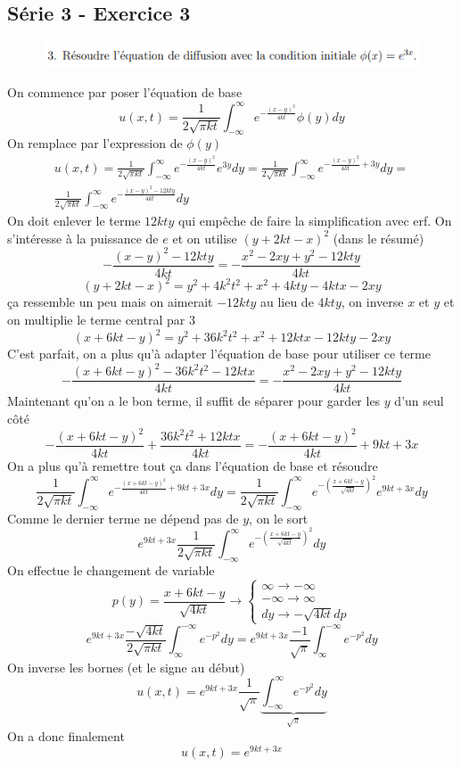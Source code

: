 \documentclass[resume]{subfiles}
\begin{document}
\begin{multicols}{2}
\subsection{Série 3 - Exercice 3}
\label{S3E3}
\begin{figure}[H]
\centering
\includegraphics[scale=0.5]{img_10.png}
\end{figure}
On commence par poser l'équation de base
$$u(x,t)=\frac{1}{2\sqrt{\pi kt}}\int_{-\infty}^{\infty}e^{-\frac{(x-y)^2}{4kt}}\phi(y)dy$$
On remplace par l'expression de $\phi(y)$
\begin{multline*}
u(x,t)=\frac{1}{2\sqrt{\pi kt}}\int_{-\infty}^{\infty}e^{-\frac{(x-y)^2}{4kt}}e^{3y}dy=\frac{1}{2\sqrt{\pi kt}}\int_{-\infty}^{\infty}e^{-\frac{(x-y)^2}{4kt}+3y}dy=\\\frac{1}{2\sqrt{\pi kt}}\int_{-\infty}^{\infty}e^{-\frac{(x-y)^2-12kty}{4kt}}dy
\end{multline*}
On doit enlever le terme $12kty$ qui empêche de faire la simplification avec erf. On s'intéresse à la puissance de $e$ et on utilise $(y+2kt-x)^2$ (dans le résumé)
$$-\frac{(x-y)^2-12kty}{4kt}=-\frac{x^2-2xy+y^2-12kty}{4kt}$$
$$(y+2kt-x)^2=y^2+4k^2t^2+x^2+4kty-4ktx-2xy$$
ça ressemble un peu mais on aimerait $-12kty$ au lieu de $4kty$, on inverse $x$ et $y$ et on multiplie le terme central par $3$
$$(x+6kt-y)^2=y^2+36k^2t^2+x^2+12ktx-12kty-2xy$$
C'est parfait, on a plus qu'à adapter l'équation de base pour utiliser ce terme
$$-\frac{(x+6kt-y)^2 - 36k^2t^2-12ktx}{4kt}=-\frac{x^2-2xy+y^2-12kty}{4kt}$$
Maintenant qu'on a le bon terme, il suffit de séparer pour garder les $y$ d'un seul côté
$$-\frac{(x+6kt-y)^2}{4kt} + \frac{36k^2t^2+12ktx}{4kt}=-\frac{(x+6kt-y)^2}{4kt} + 9kt+3x$$
On a plus qu'à remettre tout ça dans l'équation de base et résoudre
$$\frac{1}{2\sqrt{\pi kt}}\int_{-\infty}^{\infty}e^{-\frac{(x+6kt-y)^2}{4kt} + 9kt+3x}dy=\frac{1}{2\sqrt{\pi kt}}\int_{-\infty}^{\infty}e^{-\left(\frac{x+6kt-y}{\sqrt{4kt}}\right)^2}e^{9kt+3x}dy$$
Comme le dernier terme ne dépend pas de $y$, on le sort
$$e^{9kt+3x}\frac{1}{2\sqrt{\pi kt}}\int_{-\infty}^{\infty}e^{-\left(\frac{x+6kt-y}{\sqrt{4kt}}\right)^2}dy$$
On effectue le changement de variable
$$p(y)=\frac{x+6kt-y}{\sqrt{4kt}}\longrightarrow \begin{cases}\infty\to-\infty\\-\infty\to\infty\\dy\to -\sqrt{4kt}dp\end{cases}$$
$$e^{9kt+3x}\frac{-\sqrt{4kt}}{2\sqrt{\pi kt}}\int_{\infty}^{-\infty}e^{-p^2}dy=e^{9kt+3x}\frac{-1}{\sqrt{\pi}}\int_{\infty}^{-\infty}e^{-p^2}dy$$
On inverse les bornes (et le signe au début)
$$u(x,t)=e^{9kt+3x}\frac{1}{\sqrt{\pi}}\underbrace{\int_{-\infty}^{\infty}e^{-p^2}dy}_{\sqrt{\pi}}$$
On a donc finalement
$$\boxed{u(x,t)=e^{9kt+3x}}$$

\end{multicols}
\end{document}
